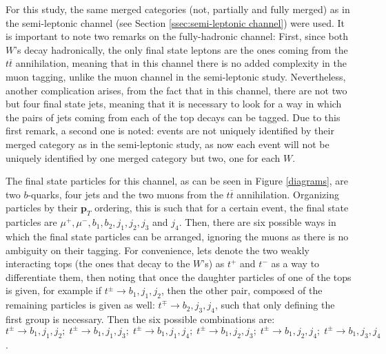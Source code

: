 For this study, the same merged categories (not, partially and fully merged) as in the semi-leptonic channel (see Section \ref{ssec:semi-leptonic channel}) were used. It is important to note two remarks on the fully-hadronic channel: First, since both $W$'s decay hadronically, the only final state leptons are the ones coming from the $t\overline t$ annihilation, meaning that in this channel there is no added complexity in the muon tagging, unlike the muon channel in the semi-leptonic study. Nevertheless, another complication arises, from the fact that in this channel, there are not two but four final state jets, meaning that it is necessary to look for a way in which the pairs of jets coming from each of the top decays can be tagged. Due to this first remark, a second one is noted: events are not uniquely identified by their merged category as in the semi-leptonic study, as now each event will not be uniquely identified by one merged category but two, one for each $W$.

The final state particles for this channel, as can be seen in Figure \ref{diagrams}, are two $b$-quarks, four jets and the two muons from the $t\overline t$ annihilation. Organizing particles by their $\bm{p}_T$ ordering, this is such that for a certain event, the final state particles are $\mu^+, \mu^-, b_1, b_2, j_1, j_2, j_3$ and $j_4$. Then, there are six possible ways in which the final state particles can be arranged, ignoring the muons as there is no ambiguity on their tagging. For convenience, lets denote the two weakly interacting tops (the ones that decay to the $W$'s) as $t^+$ and $t^-$ as a way to differentiate them, then noting that once the daughter particles of one of the tops is given, for example if $t^{\pm} \rightarrow b_1, j_1, j_2$, then the other pair, composed of the remaining particles is given as well: $t^{\mp} \rightarrow b_2, j_3, j_4$, such that only defining the first group is necessary. Then the six possible combinations are: $t^{\pm} \rightarrow b_1, j_1, j_2; \; t^{\pm} \rightarrow b_1, j_1, j_3; \; t^{\pm} \rightarrow b_1, j_1, j_4; \; t^{\pm} \rightarrow b_1, j_2, j_3; \; t^{\pm} \rightarrow b_1, j_2, j_4; \; t^{\pm} \rightarrow b_1, j_3, j_4$.

